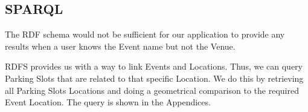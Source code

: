 \documentclass[runningheads,a4paper]{../../StyleFiles/llncs}
\begin{document}

\subsection{SPARQL}
The RDF schema would not be sufficient for our application to provide any results when a user knows the Event name but not the Venue. 

RDFS provides us with a way to link Events and Locations. Thus, we can query Parking Slots that are related to that specific Location. We do this by retrieving all Parking Slots Locations and doing a geometrical comparison to the required Event Location. The query is shown in the Appendices. 


\end{document}
